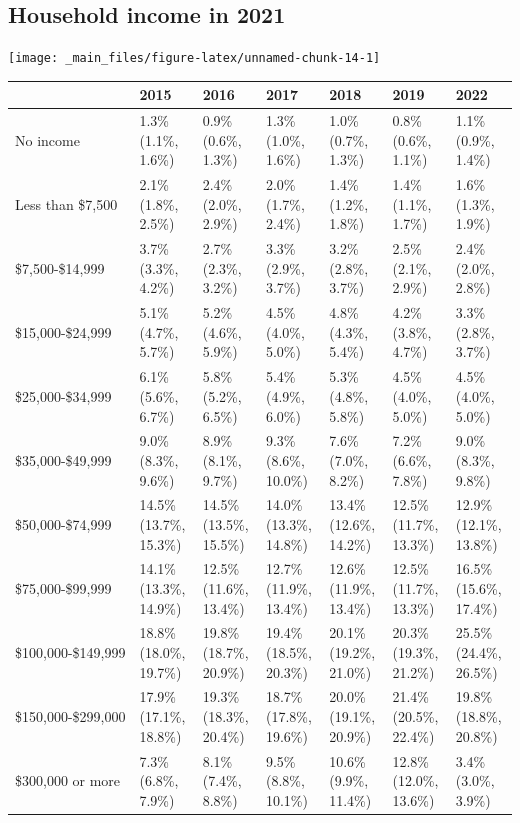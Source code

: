 \documentclass[
]{book}
\begin{document}
\hypertarget{household-income-in-2021}{%
\subsection{Household income in 2021}\label{household-income-in-2021}}

\texttt{[image: \_main\_files/figure-latex/unnamed-chunk-14-1]}

\begin{table}
\centering
\begin{tabular}[t]{>{}l|>{}l|>{}l|>{}l|>{}l|>{}l|>{}l}
\hline
  & 2015 & 2016 & 2017 & 2018 & 2019 & 2022\\
\hline
No income & 1.3\% (1.1\%, 1.6\%) & 0.9\% (0.6\%, 1.3\%) & 1.3\% (1.0\%, 1.6\%) & 1.0\% (0.7\%, 1.3\%) & 0.8\% (0.6\%, 1.1\%) & 1.1\% (0.9\%, 1.4\%)\\
\hline
Less than \$7,500 & 2.1\% (1.8\%, 2.5\%) & 2.4\% (2.0\%, 2.9\%) & 2.0\% (1.7\%, 2.4\%) & 1.4\% (1.2\%, 1.8\%) & 1.4\% (1.1\%, 1.7\%) & 1.6\% (1.3\%, 1.9\%)\\
\hline
\$7,500-\$14,999 & 3.7\% (3.3\%, 4.2\%) & 2.7\% (2.3\%, 3.2\%) & 3.3\% (2.9\%, 3.7\%) & 3.2\% (2.8\%, 3.7\%) & 2.5\% (2.1\%, 2.9\%) & 2.4\% (2.0\%, 2.8\%)\\
\hline
\$15,000-\$24,999 & 5.1\% (4.7\%, 5.7\%) & 5.2\% (4.6\%, 5.9\%) & 4.5\% (4.0\%, 5.0\%) & 4.8\% (4.3\%, 5.4\%) & 4.2\% (3.8\%, 4.7\%) & 3.3\% (2.8\%, 3.7\%)\\
\hline
\$25,000-\$34,999 & 6.1\% (5.6\%, 6.7\%) & 5.8\% (5.2\%, 6.5\%) & 5.4\% (4.9\%, 6.0\%) & 5.3\% (4.8\%, 5.8\%) & 4.5\% (4.0\%, 5.0\%) & 4.5\% (4.0\%, 5.0\%)\\
\hline
\$35,000-\$49,999 & 9.0\% (8.3\%, 9.6\%) & 8.9\% (8.1\%, 9.7\%) & 9.3\% (8.6\%, 10.0\%) & 7.6\% (7.0\%, 8.2\%) & 7.2\% (6.6\%, 7.8\%) & 9.0\% (8.3\%, 9.8\%)\\
\hline
\$50,000-\$74,999 & 14.5\% (13.7\%, 15.3\%) & 14.5\% (13.5\%, 15.5\%) & 14.0\% (13.3\%, 14.8\%) & 13.4\% (12.6\%, 14.2\%) & 12.5\% (11.7\%, 13.3\%) & 12.9\% (12.1\%, 13.8\%)\\
\hline
\$75,000-\$99,999 & 14.1\% (13.3\%, 14.9\%) & 12.5\% (11.6\%, 13.4\%) & 12.7\% (11.9\%, 13.4\%) & 12.6\% (11.9\%, 13.4\%) & 12.5\% (11.7\%, 13.3\%) & 16.5\% (15.6\%, 17.4\%)\\
\hline
\$100,000-\$149,999 & 18.8\% (18.0\%, 19.7\%) & 19.8\% (18.7\%, 20.9\%) & 19.4\% (18.5\%, 20.3\%) & 20.1\% (19.2\%, 21.0\%) & 20.3\% (19.3\%, 21.2\%) & 25.5\% (24.4\%, 26.5\%)\\
\hline
\$150,000-\$299,000 & 17.9\% (17.1\%, 18.8\%) & 19.3\% (18.3\%, 20.4\%) & 18.7\% (17.8\%, 19.6\%) & 20.0\% (19.1\%, 20.9\%) & 21.4\% (20.5\%, 22.4\%) & 19.8\% (18.8\%, 20.8\%)\\
\hline
\$300,000 or more & 7.3\% (6.8\%, 7.9\%) & 8.1\% (7.4\%, 8.8\%) & 9.5\% (8.8\%, 10.1\%) & 10.6\% (9.9\%, 11.4\%) & 12.8\% (12.0\%, 13.6\%) & 3.4\% (3.0\%, 3.9\%)\\
\hline
\end{tabular}
\end{table}
\end{document}
